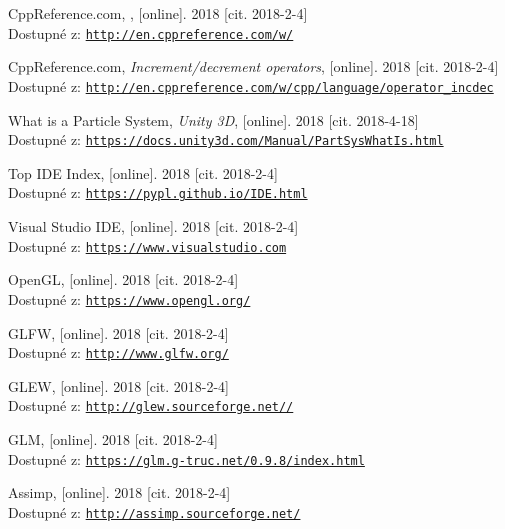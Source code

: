 \documentclass[czech,public,dept460,male,cpdeclaration]{diploma}
\begin{document}
\begin{thebibliography}{99}
	 CppReference.com,
		, [online]. 2018 [cit. 2018-2-4]\\
		Dostupné z: \href{http://en.cppreference.com/w/}{\texttt{http://en.cppreference.com/w/}}
		
	 CppReference.com,
		\textit{Increment/decrement operators}, [online]. 2018 [cit. 2018-2-4]\\
		Dostupné z: \href{http://en.cppreference.com/w/cpp/language/operator\_incdec}{\texttt{http://en.cppreference.com/w/cpp/language/operator\_incdec}}
		
	 What is a Particle System,
		\textit{Unity 3D}, [online]. 2018 [cit. 2018-4-18]\\
		Dostupné z: \href{https://docs.unity3d.com/Manual/PartSysWhatIs.html}{\texttt{https://docs.unity3d.com/Manual/PartSysWhatIs.html}}
		
	 Top IDE Index,
		[online]. 2018 [cit. 2018-2-4]\\
		Dostupné z: \href{https://pypl.github.io/IDE.html}{\texttt{https://pypl.github.io/IDE.html}}
		
	 Visual Studio IDE,
		[online]. 2018 [cit. 2018-2-4]\\
		Dostupné z: \href{https://www.visualstudio.com}{\texttt{https://www.visualstudio.com}}
		
	 OpenGL,
		[online]. 2018 [cit. 2018-2-4]\\
		Dostupné z: \href{https://www.opengl.org/}{\texttt{https://www.opengl.org/}}
		
	 GLFW,
		[online]. 2018 [cit. 2018-2-4]\\
		Dostupné z: \href{http://www.glfw.org/}{\texttt{http://www.glfw.org/}}
		
	 GLEW,
		[online]. 2018 [cit. 2018-2-4]\\
		Dostupné z: \href{http://glew.sourceforge.net/}{\texttt{http://glew.sourceforge.net//}}
		
	 GLM,
		[online]. 2018 [cit. 2018-2-4]\\
		Dostupné z: \href{https://glm.g-truc.net/0.9.8/index.html}{\texttt{https://glm.g-truc.net/0.9.8/index.html}}
		
	 Assimp,
		[online]. 2018 [cit. 2018-2-4]\\
		Dostupné z: \href{http://assimp.sourceforge.net/}{\texttt{http://assimp.sourceforge.net/}}
		

\end{thebibliography}
\end{document}
